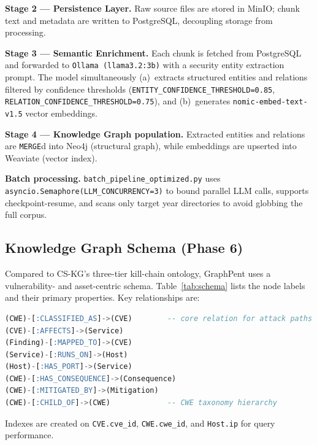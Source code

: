 \documentclass[conference]{IEEEtran}
\begin{document}
\textbf{Stage 2 — Persistence Layer.}
Raw source files are stored in MinIO; chunk text and metadata are written to
PostgreSQL, decoupling storage from processing.

\textbf{Stage 3 — Semantic Enrichment.}
Each chunk is fetched from PostgreSQL and forwarded to
\texttt{Ollama (llama3.2:3b)} with a security entity extraction prompt.
The model simultaneously (a)~extracts structured entities and relations
filtered by confidence thresholds (\texttt{ENTITY\_CONFIDENCE\_THRESHOLD=0.85},
\texttt{RELATION\_CONFIDENCE\_THRESHOLD=0.75}), and (b)~generates
\texttt{nomic-embed-text-v1.5} vector embeddings.

\textbf{Stage 4 — Knowledge Graph population.}
Extracted entities and relations are \texttt{MERGE}d into Neo4j (structural
graph), while embeddings are upserted into Weaviate (vector index).

\textbf{Batch processing.}
\texttt{batch\_pipeline\_optimized.py} uses
\texttt{asyncio.Semaphore(LLM\_CONCURRENCY=3)} to bound parallel LLM calls,
supports checkpoint-resume, and scans only target year directories
to avoid globbing the full corpus.

\subsection{Knowledge Graph Schema (Phase 6)}

Compared to CS-KG's three-tier kill-chain ontology, GraphPent uses a
vulnerability- and asset-centric schema.
Table~\ref{tab:schema} lists the node labels and their primary properties.
Key relationships are:

\begin{lstlisting}[language=SQL, caption={Core Cypher relationships (23 relation types total)}]
(CWE)-[:CLASSIFIED_AS]->(CVE)        -- core relation for attack paths
(CVE)-[:AFFECTS]->(Service)
(Finding)-[:MAPPED_TO]->(CVE)
(Service)-[:RUNS_ON]->(Host)
(Host)-[:HAS_PORT]->(Service)
(CWE)-[:HAS_CONSEQUENCE]->(Consequence)
(CWE)-[:MITIGATED_BY]->(Mitigation)
(CWE)-[:CHILD_OF]->(CWE)             -- CWE taxonomy hierarchy
\end{lstlisting}

Indexes are created on \texttt{CVE.cve\_id}, \texttt{CWE.cwe\_id}, and
\texttt{Host.ip} for query performance.
\end{document}
